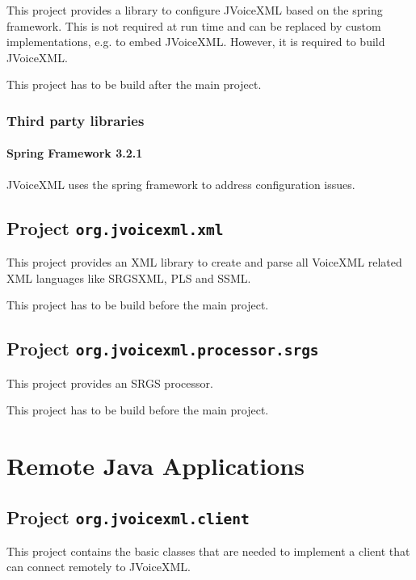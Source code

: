 \documentclass[11pt,a4paper]{article}
\begin{document}
This project provides a library to configure JVoiceXML based on the spring
framework.
This is not required at run time and can be replaced by custom
implementations, e.g. to embed JVoiceXML. However, it is required to build
JVoiceXML.

This project has to be build after the main project.

\subsubsection{Third party libraries}
\label{sec:config-third-party-libr}

\paragraph{Spring Framework 3.2.1}
\label{sec:spring-framework}

JVoiceXML uses the spring framework to address configuration issues.

\subsection{Project \texttt{org.jvoicexml.xml}}
\label{sec:org.jvoicexml.xml}

This project provides an XML library to create and parse all VoiceXML related
XML languages like SRGSXML, PLS and SSML.

This project has to be build before the main project.

\subsection{Project \texttt{org.jvoicexml.processor.srgs}}
\label{sec:org.jvoicexml.processor.srgs}

This project provides an SRGS processor.

This project has to be build before the main project.

\section{Remote Java Applications}
\subsection{Project \texttt{org.jvoicexml.client}}

This project contains the basic classes that are needed to implement a
client that can connect remotely to JVoiceXML.
\end{document}
